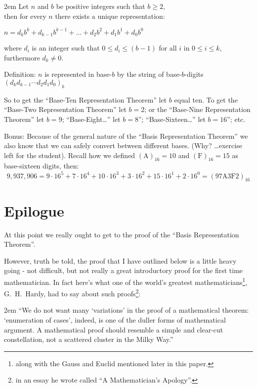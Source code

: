\documentclass{article}
\newenvironment{jprIn}{\begin{adjustwidth}{2em}{}}{\end{adjustwidth}}
\begin{document}
\begin{jprIn}
Let $n$ and $b$ be positive integers such that $b\ge2$,\\
then for every $n$ there exists a unique representation:

\hspace{3em}$n=d_kb^k+d_{k-1}b^{k-1}+\dots+d_2b^2+d_1b^1+d_0b^0$

where $d_i$ is an integer such that $0\le{}d_i\le{}(b-1)$ for all $i$ in $0\le{}i\le{}k$, furthermore $d_k\ne0$.

Definition: $n$ is represented in base-$b$ by the string of base-$b$-digits $(d_kd_{k-1}{\cdots}d_2d_1d_0)_b$
\end{jprIn}
\bigskip

So to get the ``Base-Ten Representation Theorem'' let $b$ equal ten.
To get the ``Base-Two Representation Theorem'' let $b=2$; or the ``Base-Nine Representation Theorem''
let $b=9$; ``Base-Eight\dots{}'' let $b=8$''; ``Base-Sixteen\dots{}'' let $b=16$''; etc.

Bonus: Because of the general nature of the ``Basis Representation Theorem'' we also know that we can safely convert between
different bases. (Why? \dots{}exercise left for the student).  Recall how we defined $(\text{A})_{16}=10$
and $(\text{F})_{16}=15$ as base-sixteen digits, then:
\[9,937,906=9\cdot{}16^5+7\cdot{}16^4+10\cdot{}16^3+3\cdot{}16^2+15\cdot{}16^1+2\cdot{}16^0=(\text{97A3F2})_{16}\]

\section*{Epilogue}
At this point we really ought to get to the proof of the ``Basis Representation Theorem''.

However, truth be told, the proof that I have outlined below is a little heavy going - not difficult,
but not really a great introductory proof for the first time mathematician.
In fact here's what one of the
world's greatest mathematicians\footnote{along with the Gauss and Euclid mentioned later in this paper.},
G.~H.~Hardy, had to say about such
proofs\footnote{in an essay he wrote called ``A Mathematician's Apology''.}:

\begin{jprIn}
``We do not want many `variations' in the proof of a mathematical
theorem: `enumeration of cases', indeed, is one
of the duller forms of mathematical argument. A mathematical proof
should resemble a simple and clear-cut constellation, not a scattered
cluster in the Milky Way.''
\end{jprIn}
\end{document}
